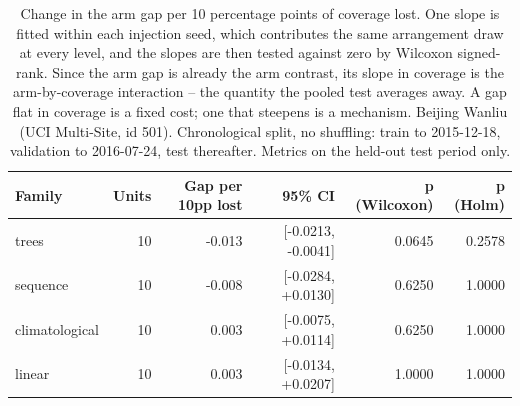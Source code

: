 \begin{table}[htbp]
\caption{Change in the arm gap per 10 percentage points of coverage lost. One slope is fitted within each injection seed, which contributes the same arrangement draw at every level, and the slopes are then tested against zero by Wilcoxon signed-rank. Since the arm gap is already the arm contrast, its slope in coverage is the arm-by-coverage interaction -- the quantity the pooled test averages away. A gap flat in coverage is a fixed cost; one that steepens is a mechanism. Beijing Wanliu (UCI Multi-Site, id 501). Chronological split, no shuffling: train to 2015-12-18, validation to 2016-07-24, test thereafter. Metrics on the held-out test period only.}
\label{tab:ablation_dose_response}
\begin{tabular}{lrrrrr}
\toprule
Family & Units & Gap per 10pp lost & 95\% CI & p (Wilcoxon) & p (Holm) \\
\midrule
trees & 10 & -0.013 & [-0.0213, -0.0041] & 0.0645 & 0.2578 \\
sequence & 10 & -0.008 & [-0.0284, +0.0130] & 0.6250 & 1.0000 \\
climatological & 10 & 0.003 & [-0.0075, +0.0114] & 0.6250 & 1.0000 \\
linear & 10 & 0.003 & [-0.0134, +0.0207] & 1.0000 & 1.0000 \\
\bottomrule
\end{tabular}
\end{table}
